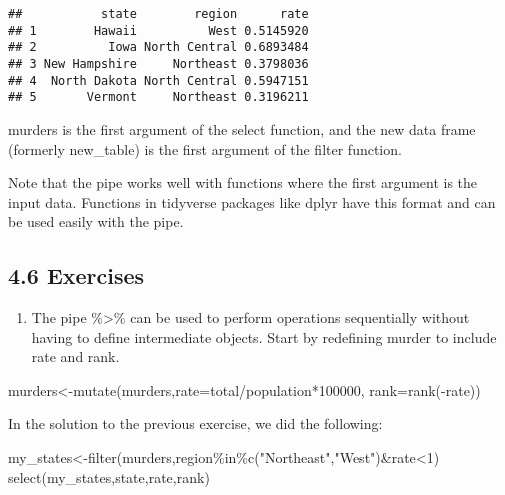 \documentclass[
]{article}
\newenvironment{Shaded}{\begin{snugshade}}{\end{snugshade}}
\newcommand{\AttributeTok}[1]{\textcolor[rgb]{0.77,0.63,0.00}{#1}}
\newcommand{\DecValTok}[1]{\textcolor[rgb]{0.00,0.00,0.81}{#1}}
\newcommand{\FunctionTok}[1]{\textcolor[rgb]{0.00,0.00,0.00}{#1}}
\newcommand{\NormalTok}[1]{#1}
\newcommand{\OtherTok}[1]{\textcolor[rgb]{0.56,0.35,0.01}{#1}}
\newcommand{\SpecialCharTok}[1]{\textcolor[rgb]{0.00,0.00,0.00}{#1}}
\newcommand{\StringTok}[1]{\textcolor[rgb]{0.31,0.60,0.02}{#1}}
\providecommand{\tightlist}{%
  \setlength{\itemsep}{0pt}\setlength{\parskip}{0pt}}
\begin{document}
\begin{verbatim}
##           state        region      rate
## 1        Hawaii          West 0.5145920
## 2          Iowa North Central 0.6893484
## 3 New Hampshire     Northeast 0.3798036
## 4  North Dakota North Central 0.5947151
## 5       Vermont     Northeast 0.3196211
\end{verbatim}

murders is the first argument of the select function, and the new data
frame (formerly new\_table) is the first argument of the filter
function.

Note that the pipe works well with functions where the first argument is
the input data. Functions in tidyverse packages like dplyr have this
format and can be used easily with the pipe.

\hypertarget{exercises-2}{%
\subsection{4.6 Exercises}\label{exercises-2}}

\begin{enumerate}
\def\labelenumi{\arabic{enumi}.}
\tightlist
\item
  The pipe \%\textgreater\% can be used to perform operations
  sequentially without having to define intermediate objects. Start by
  redefining murder to include rate and rank.
\end{enumerate}

\begin{Shaded}
\begin{Highlighting}[]
\NormalTok{murders}\OtherTok{\textless{}{-}}\FunctionTok{mutate}\NormalTok{(murders,}\AttributeTok{rate=}\NormalTok{total}\SpecialCharTok{/}\NormalTok{population}\SpecialCharTok{*}\DecValTok{100000}\NormalTok{,}
                \AttributeTok{rank=}\FunctionTok{rank}\NormalTok{(}\SpecialCharTok{{-}}\NormalTok{rate))}
\end{Highlighting}
\end{Shaded}

In the solution to the previous exercise, we did the following:

\begin{Shaded}
\begin{Highlighting}[]
\NormalTok{my\_states}\OtherTok{\textless{}{-}}\FunctionTok{filter}\NormalTok{(murders,region}\SpecialCharTok{\%in\%}\FunctionTok{c}\NormalTok{(}\StringTok{"Northeast"}\NormalTok{,}\StringTok{"West"}\NormalTok{)}\SpecialCharTok{\&}\NormalTok{rate}\SpecialCharTok{\textless{}}\DecValTok{1}\NormalTok{)}
\FunctionTok{select}\NormalTok{(my\_states,state,rate,rank)}
\end{Highlighting}
\end{Shaded}
\end{document}

